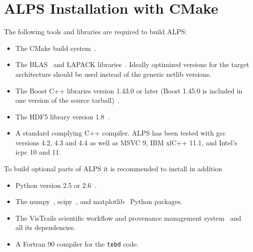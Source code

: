 \documentclass[12pt]{iopart}
\begin{document}

\section{ALPS Installation with CMake}
\label{sec:cmake}

The following tools and libraries are required to build ALPS:

\begin{itemize}
\item The CMake build system~\cite{cmake}.
\item The BLAS~\cite{blasnetlib} and LAPACK libraries~\cite{lapack}. Ideally optimized versions for the target architecture should be used instead of the generic netlib versions.
\item The Boost C++ libraries version 1.43.0 or later (Boost 1.45.0 is included in one version of the source tarball)~\cite{boost}.
\item The HDF5 library version 1.8~\cite{hdf5}.
\item A standard complying C++ compiler. ALPS has been tested with gcc versions 4.2, 4.3 and 4.4 as well as MSVC 9, IBM xlC++ 11.1, and Intel's icpc 10 and 11.
\end{itemize}
To build optional parts of ALPS it is recommended to install in addition
\begin{itemize}
\item Python version 2.5 or 2.6~\cite{python}.
\item The numpy~\cite{numpy}, scipy~\cite{scipy}, and matplotlib~\cite{matplotlib} Python packages.
\item The VisTrails scientific workflow and provenance management system~\cite{vistrails} and all its dependencies.
\item A Fortran 90 compiler for the {\tt tebd} code.
\end{itemize}
\end{document}
